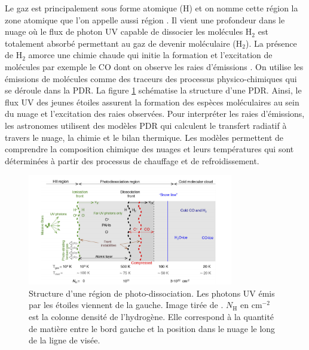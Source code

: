 \documentclass[11pt,a4paper,twoside,openright]{article}
\begin{document}
\begin{spacing}{0.98}
Le gaz est principalement sous forme atomique ($\mathrm{H}$) et on nomme cette région la zone atomique que l'on appelle aussi \og région  \fg{}. Il vient une profondeur dans le nuage où le flux de photon UV capable de dissocier les molécules $\mathrm{H}_2$ est totalement absorbé permettant au gaz de devenir moléculaire ($\mathrm{H}_2$). La présence de $\mathrm{H}_2$ amorce une chimie chaude qui initie la formation et l'excitation de molécules par exemple le $\mathrm{CO}$ dont on observe les raies d'émissions \cite{COJoblin}. On utilise les émissions de molécules comme des traceurs des processus physico-chimiques qui se déroule dans la PDR. La figure \ref{fig:intro:struct} schématise la structure d'une PDR. Ainsi, le flux UV des jeunes étoiles assurent la formation des espèces moléculaires au sein du nuage et l'excitation des raies observées. Pour interpréter les raies d'émissions, les astronomes utilisent des modèles PDR qui calculent le transfert radiatif à travers le nuage, la chimie et le bilan thermique. Les modèles permettent de comprendre la composition chimique des nuages et leurs températures qui sont déterminées à partir des processus de chauffage et de refroidissement. \newline 

\begin{figure}[!h]
    \centering
    \includegraphics[width = 0.8\textwidth]{figure/structurepdr.pdf}
    \caption{Structure d'une région de photo-dissociation. Les photons UV émis par les étoiles viennent de la gauche. Image tirée de \cite{Goicoechea2016}. $N_\mathrm{H}$ en $\mathrm{cm}^{-2}$ est la colonne densité de l'hydrogène. Elle correspond à la quantité de matière entre le bord gauche et la position dans le nuage le long de la ligne de visée.}
    \label{fig:intro:struct}
\end{figure}


\end{spacing}
\end{document}
